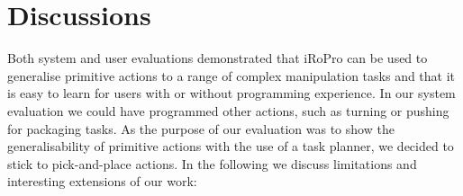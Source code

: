 

\section{Discussions}
\label{sec:discussion}
Both system and user evaluations demonstrated that iRoPro can be used to generalise primitive actions to a range of complex manipulation tasks and that it is easy to learn for users with or without programming experience.
In our system evaluation we could have programmed other actions, such as turning or pushing for packaging tasks.
As the purpose of our evaluation was to show the generalisability of primitive actions with the use of a task planner, we decided to stick to pick-and-place actions.
In the following we discuss limitations and interesting extensions of our work:

